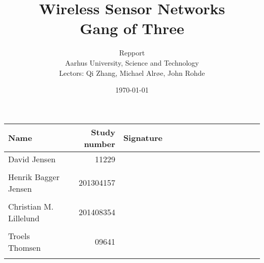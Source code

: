 \documentclass[a4paper,11pt,twoside,openright]{memoir}
\title{Wireless Sensor Networks \\ Gang of Three}
\author{Repport \\ Aarhus University, Science and Technology \\ Lectors: Qi Zhang, Michael Alrøe, John Rohde }
\date{\today}
\begin{document}
\fancyhf{} %
\frontmatter
\maketitle
\vfill


\begin{table} [h]
	\centering
	\begin{tabular}{|l|r|l|}
	\hline 
	\textbf{Name} 				& \textbf{Study number} & \textbf{Signature~~~~~~~~~~~~~~~~~~~~} 	\\ \hline
	David Jensen 				& 11229 	& \\ && 												\\ \hline
	Henrik Bagger Jensen 		& 201304157 & \\ && 												\\ \hline
	Christian M. Lillelund 		& 201408354 & \\ && 												\\ \hline
	Troels Thomsen 				& 09641		& \\ && 												\\ \hline

	\end{tabular}
\end{table}

\clearpage
\pagestyle{plain}

\tableofcontents

\vfill

\mainmatter
\pagestyle{fancy}
\fancyhf{} %
\fancyhead[CE,CO]{\nouppercase{\leftmark}}
\fancyfoot[CO,CE]{\nouppercase{\rightmark}}
\fancyfoot[LE,RO]{\thepage}

								    \cleartorightpage
								        \cleartorightpage
										\cleartorightpage
									\cleartorightpage
									\cleartorightpage

\end{document}
